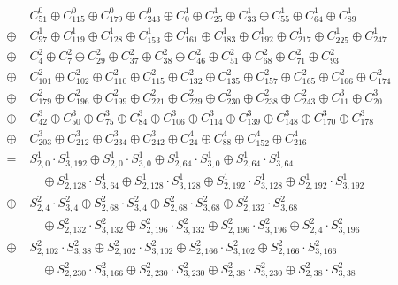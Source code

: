 \begin{align*}
&C^0_{51} \oplus C^0_{115} \oplus C^0_{179} \oplus C^0_{243} \oplus C^1_{0} \oplus C^1_{25} \oplus C^1_{33} \oplus C^1_{55} \oplus C^1_{64} \oplus C^1_{89}\\
\oplus\; & C^1_{97} \oplus C^1_{119} \oplus C^1_{128} \oplus C^1_{153} \oplus C^1_{161} \oplus C^1_{183} \oplus C^1_{192} \oplus C^1_{217} \oplus C^1_{225} \oplus C^1_{247}\\
\oplus\; & C^2_{4} \oplus C^2_{7} \oplus C^2_{29} \oplus C^2_{37} \oplus C^2_{38} \oplus C^2_{46} \oplus C^2_{51} \oplus C^2_{68} \oplus C^2_{71} \oplus C^2_{93}\\
\oplus\; & C^2_{101} \oplus C^2_{102} \oplus C^2_{110} \oplus C^2_{115} \oplus C^2_{132} \oplus C^2_{135} \oplus C^2_{157} \oplus C^2_{165} \oplus C^2_{166} \oplus C^2_{174}\\
\oplus\; & C^2_{179} \oplus C^2_{196} \oplus C^2_{199} \oplus C^2_{221} \oplus C^2_{229} \oplus C^2_{230} \oplus C^2_{238} \oplus C^2_{243} \oplus C^3_{11} \oplus C^3_{20}\\
\oplus\; & C^3_{42} \oplus C^3_{50} \oplus C^3_{75} \oplus C^3_{84} \oplus C^3_{106} \oplus C^3_{114} \oplus C^3_{139} \oplus C^3_{148} \oplus C^3_{170} \oplus C^3_{178}\\
\oplus\; & C^3_{203} \oplus C^3_{212} \oplus C^3_{234} \oplus C^3_{242} \oplus C^4_{24} \oplus C^4_{88} \oplus C^4_{152} \oplus C^4_{216}\\
=\; & S^1_{2,0} \cdot S^1_{3,192} \oplus S^1_{2,0} \cdot S^1_{3,0} \oplus S^1_{2,64} \cdot S^1_{3,0} \oplus S^1_{2,64} \cdot S^1_{3,64}\\
&\quad \oplus S^1_{2,128} \cdot S^1_{3,64} \oplus S^1_{2,128} \cdot S^1_{3,128} \oplus S^1_{2,192} \cdot S^1_{3,128} \oplus S^1_{2,192} \cdot S^1_{3,192}\tag*{weight 3}\\
\oplus\; & S^2_{2,4} \cdot S^2_{3,4} \oplus S^2_{2,68} \cdot S^2_{3,4} \oplus S^2_{2,68} \cdot S^2_{3,68} \oplus S^2_{2,132} \cdot S^2_{3,68}\\
&\quad \oplus S^2_{2,132} \cdot S^2_{3,132} \oplus S^2_{2,196} \cdot S^2_{3,132} \oplus S^2_{2,196} \cdot S^2_{3,196} \oplus S^2_{2,4} \cdot S^2_{3,196}\tag*{weight 3}\\
\oplus\; & S^2_{2,102} \cdot S^2_{3,38} \oplus S^2_{2,102} \cdot S^2_{3,102} \oplus S^2_{2,166} \cdot S^2_{3,102} \oplus S^2_{2,166} \cdot S^2_{3,166}\\
&\quad \oplus S^2_{2,230} \cdot S^2_{3,166} \oplus S^2_{2,230} \cdot S^2_{3,230} \oplus S^2_{2,38} \cdot S^2_{3,230} \oplus S^2_{2,38} \cdot S^2_{3,38}\tag*{weight 3}\\

\end{align*}
